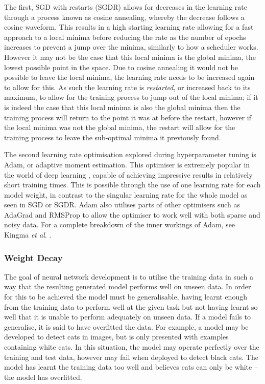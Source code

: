 The first, SGD with restarts (SGDR) \cite{loshchilov_sgdr:_2016} allows for decreases in the learning rate through a process known as cosine annealing, whereby the decrease follows a cosine waveform. This results in a high starting learning rate allowing for a fast approach to a local minima before reducing the rate as the number of epochs increases to prevent a jump over the minima, similarly to how a scheduler works. However it may not be the case that this local minima is the global minima, the lowest possible point in the space. Due to cosine annealing it would not be possible to leave the local minima, the learning rate needs to be increased again to allow for this. As such the learning rate is \textit{restarted}, or increased back to its maximum, to allow for the training process to jump out of the local minima; if it is indeed the case that this local minima is also the global minima then the training process will return to the point it was at before the restart, however if the local minima was not the global minima, the restart will allow for the training process to leave the sub-optimal minima it previously found. 

The second learning rate optimisation explored during hyperparameter tuning is Adam, or adaptive moment estimation. This optimiser is extremely popular in the world of deep learning \cite{karpathy_peek_2017}, capable of achieving impressive results in relatively short training times. This is possible through the use of one learning rate for each model weight, in contrast to the singular learning rate for the whole model as seen in SGD or SGDR. Adam also utilises parts of other optimisers such as AdaGrad \cite{duchi_adaptive_2011} and RMSProp \cite{tieleman_lecture_2012} to allow the optimiser to work well with both sparse and noisy data. For a complete breakdown of the inner workings of Adam, see Kingma \textit{et al}. \cite{kingma_adam:_2014}. 

\subsubsection{Weight Decay}\label{ch:cetDet,sec:ModelSelection,sub:TrainingHyperparameters,subsub:WeightDecay}

The goal of neural network development is to utilise the training data in such a way that the resulting generated model performs well on unseen data. In order for this to be achieved the model must be generalisable, having learnt enough from the training data to perform well at the given task but not having learnt so well that it is unable to perform adequately on unseen data. If a model fails to generalise, it is said to have overfitted the data. For example, a model may be developed to detect cats in images, but is only presented with examples containing white cats. In this situation, the model may operate perfectly over the training and test data, however may fail when deployed to detect black cats. The model has learnt the training data too well and believes cats can only be white -- the model has overfitted. 


